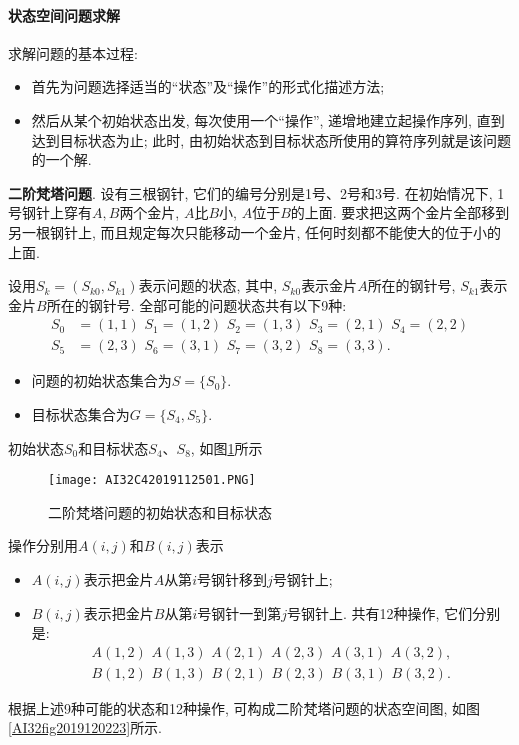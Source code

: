 \paragraph{状态空间问题求解}
求解问题的基本过程:
\begin{itemize}
\item 首先为问题选择适当的“状态”及“操作”的形式化描述方法;
\item 然后从某个初始状态出发, 每次使用一个“操作”, 递增地建立起操作序列, 直到达到目标状态为止; 此时, 由初始状态到目标状态所使用的算符序列就是该问题的一个解.
\end{itemize}
\begin{example}
  \textbf{二阶梵塔问题}. 设有三根钢针, 它们的编号分别是1号、2号和3号. 在初始情况下, 1号钢针上穿有$A,B$两个金片, $A$比$B$小, $A$位于$B$的上面. 要求把这两个金片全部移到另一根钢针上, 而且规定每次只能移动一个金片, 任何时刻都不能使大的位于小的上面.
\end{example}
\begin{result}
设用$S_k=(S_{k0}, S_{k1})$表示问题的状态, 其中, $S_{k0}$表示金片$A$所在的钢针号, $S_{k1}$表示金片$B$所在的钢针号.
全部可能的问题状态共有以下9种:
\begin{align}
S_0&=(1, 1)\,\,   S_1=(1, 2)\,\,     S_2=(1, 3)\,\,    S_3=(2, 1)\,\,    S_4=(2, 2)\\
S_5&=(2, 3)\,\,   S_6=(3, 1) \,\,    S_7=(3, 2) \,\,   S_8=(3, 3).
\end{align}

\begin{itemize}
\item 问题的初始状态集合为$S=\{S_0\}$.
\item 目标状态集合为$G=\{S_4, S_5\}$.
\end{itemize}
初始状态$S_0$和目标状态$S_4$、$S_8$, 如图\ref{AI32fig2019120222}所示
\begin{figure}[H]
\centering
\texttt{[image: AI32C42019112501.PNG]}
\caption{二阶梵塔问题的初始状态和目标状态}
\label{AI32fig2019120222}
\end{figure}
操作分别用$A(i, j)$和$B(i, j)$表示
\begin{itemize}
\item  $A(i, j)$表示把金片$A$从第$i$号钢针移到$j$号钢针上;
\item  $B(i, j)$表示把金片$B$从第$i$号钢针一到第$j$号钢针上. 共有12种操作, 它们分别是:
\begin{align*}
      A(1, 2)\,\,   A(1, 3) \,\,    A(2, 1)\,\,     A(2, 3) \,\,    A(3, 1) \,\,    A(3, 2),\\
      B(1, 2)\,\,     B(1, 3) \,\,     B(2, 1)\,\,     B(2, 3)  \,\,   B(3, 1)  \,\,    B(3, 2).
\end{align*}
\end{itemize}
根据上述9种可能的状态和12种操作, 可构成二阶梵塔问题的状态空间图, 如图\ref{AI32fig2019120223}所示.
\end{result}

